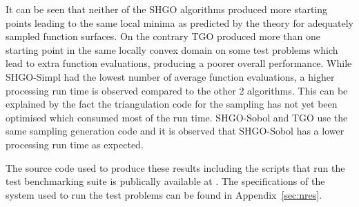 It can be seen that neither of the SHGO algorithms produced more starting points leading to the same local minima as predicted by the theory for adequately sampled function surfaces. On the contrary TGO produced more than one starting point in the same locally convex domain on some test problems which lead to extra function evaluations, producing a poorer overall performance. While SHGO-Simpl had the lowest number of average function evaluations, a higher processing run time is observed compared to the other 2 algorithms. This can be explained by the fact the triangulation code for the sampling has not yet been optimised which consumed most of the run time. SHGO-Sobol and TGO use the same sampling generation code and it is observed that SHGO-Sobol has a lower processing run time as expected.


The source code used to produce these results including the scripts that run the test benchmarking suite is publically available at \cite{SHGOpy}. The specifications of the system used to run the test problems can be found in Appendix~\ref{sec:nres}.



